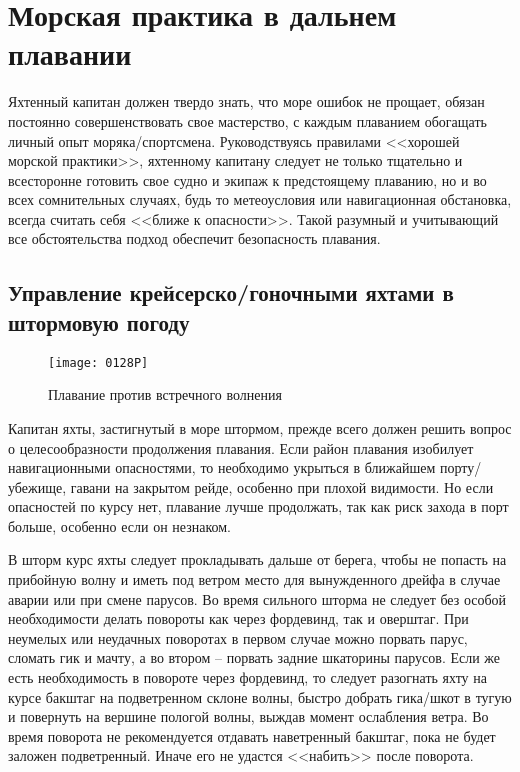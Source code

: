 \chapter{Морская практика в дальнем плавании}

Яхтенный капитан должен твердо знать, что море ошибок не прощает, обязан постоянно совершенствовать свое мастерство, с каждым плаванием обогащать личный опыт моряка\-/спортсмена. Руководствуясь правилами <<хорошей морской практики>>, яхтенному капитану следует не только тщательно и всесторонне готовить свое судно и экипаж к предстоящему плаванию, но и во всех сомнительных случаях, будь то метеоусловия или навигационная обстановка, всегда считать себя <<ближе к опасности>>. Такой разумный и учитывающий все обстоятельства подход обеспечит безопасность плавания.

\section{Управление крейсерско\-/гоночными яхтами в штормовую погоду}

\begin{figure*}[htb]
  \centering{}
  \texttt{[image: 0128P]}
  \caption{Плавание против встречного волнения}
  \label{fig:128}
\end{figure*}

Капитан яхты, застигнутый в море штормом, прежде всего должен решить вопрос о целесообразности продолжения плавания. Если район плавания изобилует навигационными опасностями, то необходимо укрыться в ближайшем порту\-/убежище, гавани на закрытом рейде, особенно при плохой видимости. Но если опасностей по курсу нет, плавание лучше продолжать, так как риск захода в порт больше, особенно если он незнаком.

В шторм курс яхты следует прокладывать дальше от берега, чтобы не попасть на прибойную волну и иметь под ветром место для вынужденного дрейфа в случае аварии или при смене парусов. Во время сильного шторма не следует без особой необходимости делать повороты как через фордевинд, так и оверштаг. При неумелых или неудачных поворотах в первом случае можно порвать парус, сломать гик и мачту, а во втором \--- порвать задние шкаторины парусов. Если же есть необходимость в повороте через фордевинд, то следует разогнать яхту на курсе бакштаг на подветренном склоне волны, быстро добрать гика\-/шкот в тугую и повернуть на вершине пологой волны, выждав момент ослабления ветра. Во время поворота не рекомендуется отдавать наветренный бакштаг, пока не будет заложен подветренный. Иначе его не удастся <<набить>> после поворота.


